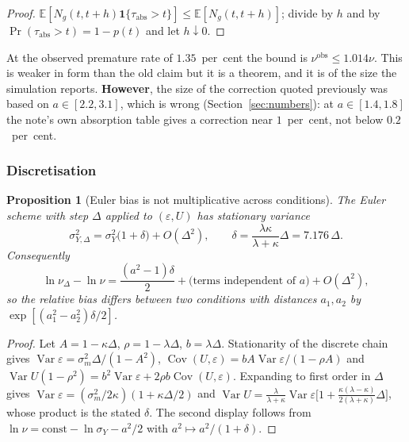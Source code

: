 \documentclass[11pt,a4paper]{article}
\newcommand{\E}{\mathbb{E}}
\newcommand{\Var}{\operatorname{Var}}
\newcommand{\Cov}{\operatorname{Cov}}
\theoremstyle{plain}
\newtheorem{proposition}{Proposition}
\theoremstyle{remark}
\begin{document}
\begin{proof}
$\E[N_g(t,t+h)\mathbf 1\{\tau_{\text{abs}}>t\}]\le\E[N_g(t,t+h)]$; divide by $h$ and by
$\Pr(\tau_{\text{abs}}>t)=1-p(t)$ and let $h\downarrow0$.
\end{proof}

At the observed premature rate of $1.35$~per~cent the bound is $\nu^{\text{obs}}\le1.014\nu$.
This is weaker in form than the old claim but it is a theorem, and it is of the size the
simulation reports. \textbf{However}, the size of the correction quoted previously was
based on $a\in[2.2,3.1]$, which is wrong (Section~\ref{sec:numbers}): at
$a\in[1.4,1.8]$ the note's own absorption table gives a correction near $1$~per~cent, not
below $0.2$~per~cent.

\subsubsection{Discretisation}
\label{sec:discretisation}

\begin{proposition}[Euler bias is not multiplicative across conditions]
\label{prop:euler}
The Euler scheme with step $\Delta$ applied to $(\varepsilon,U)$ has stationary variance
\begin{equation}
\sigma_{Y,\Delta}^2=\sigma_Y^2\bigl(1+\delta\bigr)+O(\Delta^2),\qquad
\delta=\frac{\lambda\kappa}{\lambda+\kappa}\Delta=7.176\,\Delta .
\end{equation}
Consequently
\begin{equation}
\ln\nu_\Delta-\ln\nu=\frac{(a^2-1)\delta}{2}+\text{(terms independent of }a)+O(\Delta^2),
\end{equation}
so the relative bias differs between two conditions with distances $a_1,a_2$ by
$\exp[(a_1^2-a_2^2)\delta/2]$.
\end{proposition}

\begin{proof}
Let $A=1-\kappa\Delta$, $\rho=1-\lambda\Delta$, $b=\lambda\Delta$. Stationarity of the
discrete chain gives $\Var\varepsilon=\sigma_m^2\Delta/(1-A^2)$,
$\Cov(U,\varepsilon)=bA\Var\varepsilon/(1-\rho A)$ and
$\Var U(1-\rho^2)=b^2\Var\varepsilon+2\rho b\Cov(U,\varepsilon)$. Expanding to first order
in $\Delta$ gives $\Var\varepsilon=(\sigma_m^2/2\kappa)(1+\kappa\Delta/2)$ and
$\Var U=\frac{\lambda}{\lambda+\kappa}\Var\varepsilon\bigl[1+\tfrac{\kappa(\lambda-\kappa)}{2(\lambda+\kappa)}\Delta\bigr]$,
whose product is the stated $\delta$. The second display follows from
$\ln\nu=\text{const}-\ln\sigma_Y-a^2/2$ with $a^2\mapsto a^2/(1+\delta)$.
\end{proof}
\end{document}
